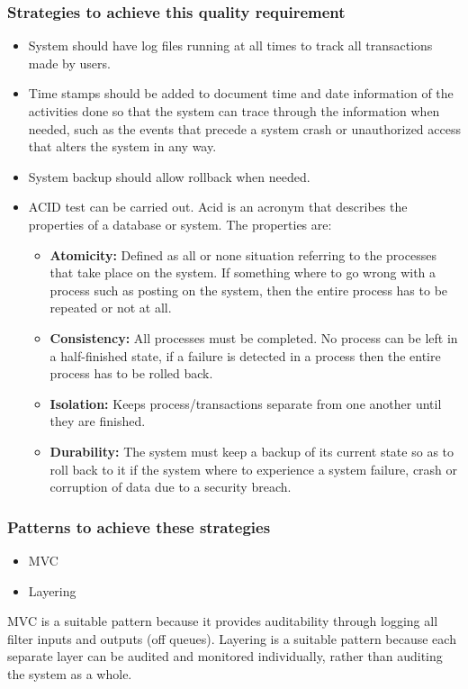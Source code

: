\documentclass[a4paper,12pt]{article}
\begin{document}
 \subsubsection{Strategies to achieve this quality requirement}
 \begin{itemize}
 \item System should have log files running at all times to track all transactions made by users. 
 \item Time stamps should be added to document time and date information of the activities done so that the system can trace through the
information when needed, such as the events that precede a system crash or unauthorized access
that alters the system in any way.
\item System backup should allow rollback when needed.
\item ACID test can be carried out. Acid is an acronym that describes the properties of a database or system. The properties are:
	\begin{itemize}
	\item \textbf{Atomicity:} Defined as all or none situation referring to the processes that take place on the 
	   system. If something where to go wrong with a process such as posting on the system,
	   then the entire process has to be repeated or not at all.
	\item \textbf{Consistency:} All processes must be completed. No process can be left in a half-finished state,
	     if a failure is detected in a process then the entire process has to be rolled back.
	\item \textbf{Isolation:} Keeps process/transactions separate from one another until they are finished.
	\item \textbf{Durability:} The system must keep a backup of its current state so as to roll back to it if
	    the system where to experience a system failure, crash or corruption of data due
	    to a security breach.
	\end{itemize}
 \end{itemize}
 \subsubsection{Patterns to achieve these strategies}
 \begin{itemize}
 \item MVC
 \item Layering
\end{itemize} 
 MVC is a suitable pattern because it provides auditability through logging all filter inputs and outputs (off queues). Layering is a suitable pattern because each separate layer can be audited and monitored individually, rather than auditing the system as a whole.
  
\end{document}
